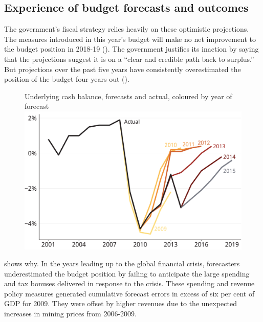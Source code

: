 \documentclass[twoside,english]{palatinob5ona4portrait}
\begin{document}
\subsection{Experience of budget forecasts and outcomes}\label{subsubsec:3-3-3}
The government’s fiscal strategy relies heavily on these optimistic projections. The measures introduced in this year’s budget will make no net improvement to the budget position in 2018-19 (). The government justifies its inaction by saying that the projections suggest it is on a “clear and credible path back to surplus.”  But projections over the past five years have consistently overestimated the position of the budget four years out (). 
\begin{figure}
%
{Underlying cash balance, forecasts and actual, coloured by year of forecast}
\includegraphics[width=\columnwidth]{b5-figure/FISCAL-Figure9a-1.pdf}
\end{figure}

 shows why. In the years leading up to the global financial crisis, forecasters underestimated the budget position by failing to anticipate the large spending and tax bonuses delivered in response to the crisis. These spending and revenue policy measures generated cumulative forecast errors in excess of six per cent of GDP for 2009.  They were offset by higher revenues due to the unexpected increases in mining prices from 2006-2009.
\end{document}
